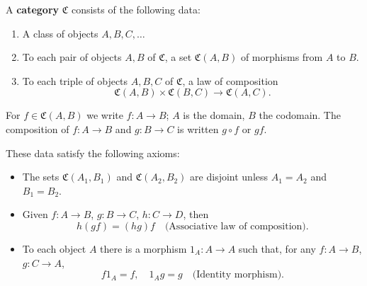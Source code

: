 A \textbf{category} $\mathfrak{C}$ consists of the following data:

\begin{enumerate}
\item A class of objects $A, B, C, \ldots$
\item To each pair of objects $A, B$ of $\mathfrak{C}$, a set $\mathfrak{C}(A, B)$ of morphisms from $A$ to $B$.
\item To each triple of objects $A, B, C$ of $\mathfrak{C}$, a law of composition
  $$\mathfrak{C}(A, B) \times \mathfrak{C}(B, C) \to \mathfrak{C}(A, C).$$
\end{enumerate}

For $f \in \mathfrak{C}(A, B)$ we write $f: A \to B$; $A$ is the domain, $B$ the codomain. The composition of $f: A \to B$ and $g: B \to C$ is written $g \circ f$ or $gf$.

These data satisfy the following axioms:

\begin{itemize}
\item[\textbf{A1.}] The sets $\mathfrak{C}(A_1, B_1)$ and $\mathfrak{C}(A_2, B_2)$ are disjoint unless $A_1 = A_2$ and $B_1 = B_2$.
\item[\textbf{A2.}] Given $f: A \to B$, $g: B \to C$, $h: C \to D$, then
  $$h(gf) = (hg)f \quad \text{(Associative law of composition)}.$$
\item[\textbf{A3.}] To each object $A$ there is a morphism $1_A: A \to A$ such that, for any $f: A \to B$, $g: C \to A$,
  $$f 1_A = f, \quad 1_A g = g \quad \text{(Identity morphism)}.$$
\end{itemize}
